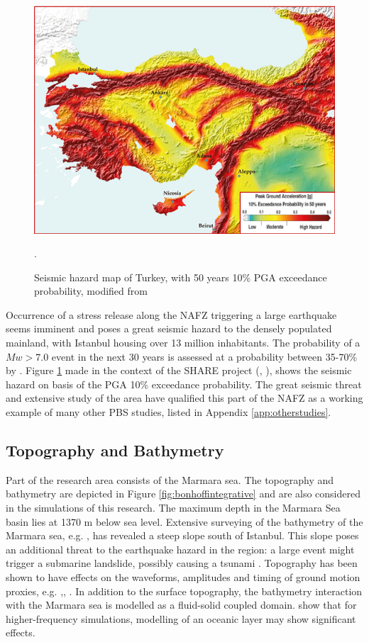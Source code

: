 \documentclass[../Text/00main.tex]{subfiles}
\begin{document}
\begin{figure}
    \centering
    \includegraphics[width=0.7\linewidth]{images_methods/Hazmap_turkey.png}
    \caption{Seismic hazard map of Turkey, with 50 years 10\% PGA exceedance probability, modified from \cite{giardini2018seismic}}.
    \label{fig:hazmap}
\end{figure}
    
Occurrence of a stress release along the NAFZ triggering a large earthquake seems imminent and poses a great seismic hazard to the densely populated mainland, with Istanbul housing over 13 million inhabitants. The probability of a $Mw > 7.0$ event in the next 30 years is assessed at a probability between 35-70\% by \citet{murru2016m}. Figure \ref{fig:hazmap} made in the context of the SHARE project (\cite{woessner20152013}, \cite{giardini2018seismic}), shows the seismic hazard on basis of the PGA 10\% exceedance probability. The great seismic threat and extensive study of the area have qualified this part of the NAFZ as a working example of many other PBS studies, listed in Appendix \ref{app:otherstudies}.

\subsection{Topography and Bathymetry}

Part of the research area consists of the Marmara sea. The topography and bathymetry are depicted in Figure \ref{fig:bonhoffintegrative} and are also considered in the simulations of this research. The maximum depth in the Marmara Sea basin lies at 1370 m below sea level. Extensive surveying of the bathymetry of the Marmara sea, e.g. \citet{grall2018processed}, has revealed a steep slope south of Istanbul. This slope poses an additional threat to the earthquake hazard in the region: a large event might trigger a submarine landslide, possibly causing a tsunami \citep{tappin2002tsunami}. Topography has been shown to have effects on the waveforms, amplitudes and timing of ground motion proxies, e.g. \citet{veeraraghavan_simulation_2020},\citet{zhang2008numerical}, \cite{pienkowska2020high}. In addition to the surface topography, the bathymetry interaction with the Marmara sea is modelled as a fluid-solid coupled domain. \citet{afanasiev2019effect} show that for higher-frequency simulations, modelling of an oceanic layer may show significant effects. 
\end{document}
